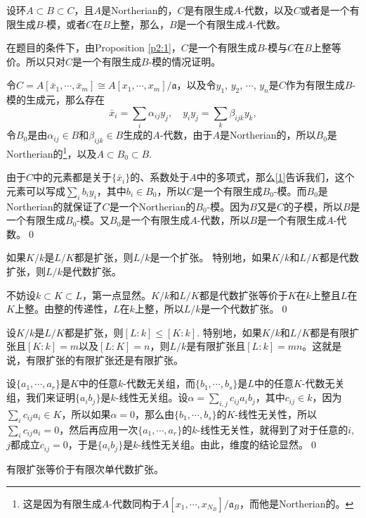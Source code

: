 \pro 设环$A\subset B\subset C$，且$A$是Northerian的，$C$是有限生成$A$-代数，以及$C$或者是一个有限生成$B$-模，或者$C$在$B$上整，那么，$B$是一个有限生成$A$-代数。
	\label{p:2.4}

\proof 在题目的条件下，由Proposition \ref{p2:1}，$C$是一个有限生成$B$-模与$C$在$B$上整等价。所以只对$C$是一个有限生成$B$-模的情况证明。

	令$C=A[\bar{x}_1,\cdots,\bar{x}_m]\cong A[x_1,\cdots,x_m]/\mathfrak{a}$，以及令$y_1$, $y_2$, $\cdots$, $y_n$是$C$作为有限生成$B$-模的生成元，那么存在
	\begin{equation}
		\bar{x}_i=\sum_i\alpha_{ij}y_j,\quad y_iy_j=\sum_{k}\beta_{ijk}y_k,
		\label{1}
	\end{equation}
	令$B_0$是由$\alpha_{ij}\in B$和$\beta_{ijk}\in B$生成的$A$-代数，由于$A$是Northerian的，所以$B_0$是Northerian的\footnote{这是因为有限生成$A$-代数同构于$A[x_1,\cdots,x_{N_B}]/\mathfrak{a}_B$，而他是Northerian的。}，以及$A\subset B_0 \subset B$.

	由于$C$中的元素都是关于$\{\bar{x}_i\}$的、系数处于$A$中的多项式，那么\eqref{1}告诉我们，这个元素可以写成$\sum_i b_i y_i$，其中$b_i\in B_0$，所以$C$是一个有限生成$B_0$-模。而$B_0$是Northerian的就保证了$C$是一个Northerian的$B_0$-模。因为$B$又是$C$的子模，所以$B$是一个有限生成$B_0$-模。又$B_0$是一个有限生成$A$-代数，所以$B$是一个有限生成$A$-代数。\qed

\pro 如果$K/k$是$L/K$都是扩张，则$L/k$是一个扩张。 特别地，如果$K/k$和$L/K$都是代数扩张，则$L/k$是代数扩张。

\proof 不妨设$k\subset K\subset L$，第一点显然。$K/k$和$L/K$都是代数扩张等价于$K$在$k$上整且$L$在$K$上整。由整的传递性，$L$在$k$上整，所以$L/k$是一个代数扩张。\qed

\pro 设$K/k$是$L/K$都是扩张，则$[L:k]\leq[K:k]$. 特别地，如果$K/k$和$L/K$都是有限扩张且$[K:k]=m$以及$[L:K]=n$，则$L/k$是有限扩张且$[L:k]=mn$。这就是说，有限扩张的有限扩张还是有限扩张。

\proof 设$\{a_1,\cdots,a_r\}$是$K$中的任意$k$-代数无关组，而$\{b_1,\cdots,b_s\}$是$L$中的任意$K$-代数无关组，我们来证明$\{a_ib_j\}$是$k$-线性无关组。设$\alpha=\sum_{i,j}c_{ij}a_ib_j$，其中$c_{ij}\in k$，因为$\sum_i c_{ij}a_i\in K$，所以如果$\alpha=0$，那么由$\{b_1,\cdots,b_s\}$的$K$-线性无关性，所以$\sum_i c_{ij}a_i=0$，然后再应用一次$\{a_1,\cdots,a_r\}$的$k$-线性无关性，就得到了对于任意的$i$, $j$都成立$c_{ij}=0$，于是$\{a_ib_j\}$是$k$-线性无关组。由此，维度的结论显然。\qed

\pro 有限扩张等价于有限次单代数扩张。

